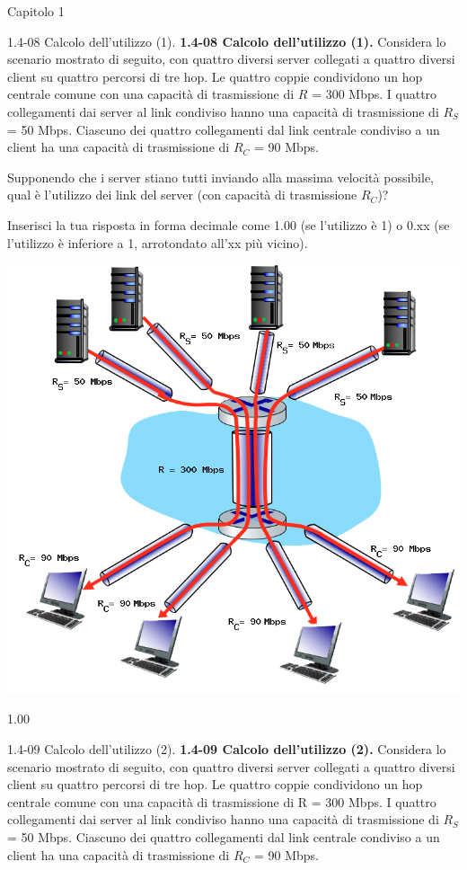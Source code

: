 \documentclass[a4paper]{article}
\begin{document}
\begin{quiz}{Capitolo 1}
\begin{shortanswer}[points=1]{1.4-08 Calcolo dell'utilizzo (1).}
\textbf{1.4-08 Calcolo dell'utilizzo (1).} 
Considera lo scenario mostrato di seguito, con quattro diversi server collegati a quattro diversi client su quattro percorsi di tre hop. Le quattro coppie condividono un hop centrale comune con una capacità di trasmissione di $R$ = 300 Mbps. I quattro collegamenti dai server al link condiviso hanno una capacità di trasmissione di $R_S$ = 50 Mbps. Ciascuno dei quattro collegamenti dal link centrale condiviso a un client ha una capacità di trasmissione di $R_C$ = 90 Mbps. 

Supponendo che i server stiano tutti inviando alla massima velocità possibile, qual è l'utilizzo dei link del server (con capacità di trasmissione $R_C$)? 

Inserisci la tua risposta in forma decimale come 1.00 (se l'utilizzo è 1) o 0.xx (se l'utilizzo è inferiore a 1, arrotondato all'xx più vicino). 

\begin{center}
\includegraphics[width=\linewidth]{figs/1.4.7.png}
\end{center}
\item* 1.00
\end{shortanswer}

\begin{shortanswer}[points=1]{1.4-09 Calcolo dell'utilizzo (2).}
\textbf{1.4-09 Calcolo dell'utilizzo (2).} 
Considera lo scenario mostrato di seguito, con quattro diversi server collegati a quattro diversi client su quattro percorsi di tre hop. Le quattro coppie condividono un hop centrale comune con una capacità di trasmissione di R = 300 Mbps. I quattro collegamenti dai server al link condiviso hanno una capacità di trasmissione di $R_S$ = 50 Mbps. Ciascuno dei quattro collegamenti dal link centrale condiviso a un client ha una capacità di trasmissione di $R_C$ = 90 Mbps. 


\end{shortanswer}
\end{quiz}
\end{document}
